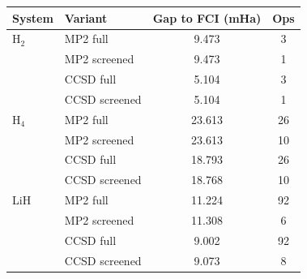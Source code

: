 \begin{tabular}{llcc}
    \toprule
    System & Variant & Gap to FCI (mHa) & Ops \\
    \midrule
    H$_2$ & MP2 full & 9.473 & 3 \\
     & MP2 screened & 9.473 & 1 \\
     & CCSD full & 5.104 & 3 \\
     & CCSD screened & 5.104 & 1 \\
    H$_4$ & MP2 full & 23.613 & 26 \\
     & MP2 screened & 23.613 & 10 \\
     & CCSD full & 18.793 & 26 \\
     & CCSD screened & 18.768 & 10 \\
    LiH & MP2 full & 11.224 & 92 \\
     & MP2 screened & 11.308 & 6 \\
     & CCSD full & 9.002 & 92 \\
     & CCSD screened & 9.073 & 8 \\
    \bottomrule
\end{tabular}
